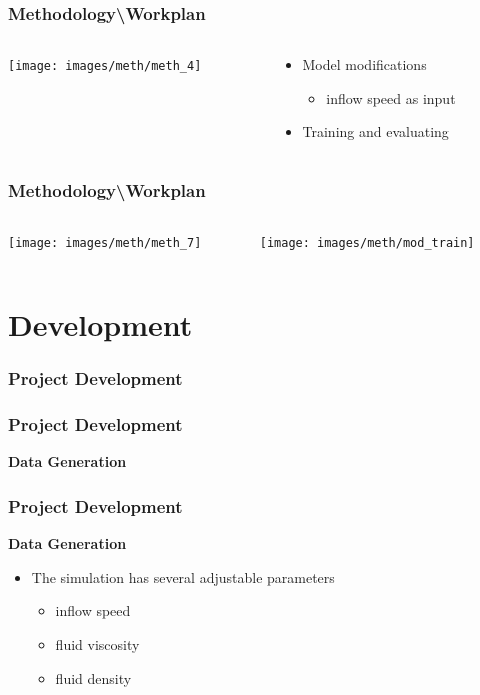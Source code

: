 \documentclass[18pt]{beamer}
\begin{document}
\begin{frame}[t]
  \frametitle{Methodology\textbackslash Workplan}
  \begin{columns}[t]
    \begin{column}{0.35\textwidth}
      \texttt{[image: images/meth/meth\_4]}
    \end{column}
    \begin{column}[t]{0.65\textwidth}
      \vspace*{-5cm}
      \begin{itemize}
      \item Model modifications
        \begin{itemize}
        \item inflow speed as input
        \end{itemize}
      \item Training and evaluating
      \end{itemize}
    \end{column}
  \end{columns}
\end{frame}


\begin{frame}
  \frametitle{Methodology\textbackslash Workplan}
  \begin{columns}
    \begin{column}{0.35\textwidth}
      \texttt{[image: images/meth/meth\_7]}
    \end{column}
    \begin{column}[c]{0.65\textwidth}
      \texttt{[image: images/meth/mod\_train]}
    \end{column}
  \end{columns}
\end{frame}



\section{Development}

\begin{frame}[t]
  \frametitle{Project Development}
\end{frame}


\begin{frame}[t]
  \frametitle{Project Development}
  \large{\textbf{Data Generation}}
\end{frame}



\begin{frame}[t]
  \frametitle{Project Development}
  \large{\textbf{Data Generation}}

  \begin{itemize}
  \item The simulation has several adjustable parameters
    \begin{itemize}
    \item inflow speed
    \item fluid viscosity
    \item fluid density
    \end{itemize}
  \end{itemize}
  
\end{frame}
\end{document}
